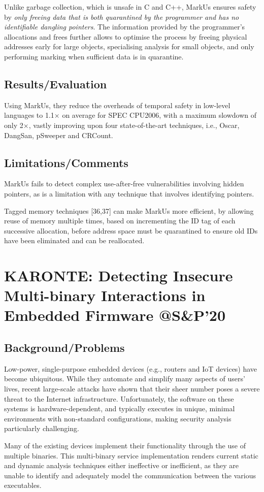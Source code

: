 Unlike garbage collection, which is unsafe in C and C++, MarkUs ensures safety by \emph{only freeing data that is both quarantined by the programmer and has no identifiable dangling pointers}. The information provided by the programmer’s allocations and frees further allows to optimise the process by freeing physical addresses early for large objects, specialising analysis for small objects, and only performing marking when sufficient data is in quarantine. 
\subsection{Results/Evaluation}
Using MarkUs, they reduce the overheads of temporal safety in low-level languages to 1.1$\times$ on average for SPEC CPU2006, with a maximum slowdown of only 2$\times$, vastly improving upon four state-of-the-art techniques, i.e., Oscar, DangSan, pSweeper and CRCount.
\subsection{Limitations/Comments}
MarkUs fails to detect complex use-after-free vulnerabilities involving hidden pointers, as is a limitation with any technique that involves identifying pointers.

Tagged memory techniques [36,37] can make MarkUs more efficient, by allowing reuse of memory multiple times, based on incrementing the ID tag of each successive allocation, before address space must be quarantined to ensure old IDs have been eliminated and can be reallocated.
\newpage
\section{KARONTE: Detecting Insecure Multi-binary Interactions in Embedded Firmware @S\&P'20}
\subsection{Background/Problems}
Low-power, single-purpose embedded devices (e.g., routers and IoT devices) have become ubiquitous. While they automate and simplify many aspects of users’ lives, recent large-scale attacks have shown that their sheer number poses a severe threat to the Internet infrastructure. Unfortunately, the software on these systems is hardware-dependent, and typically executes in unique, minimal environments with non-standard configurations, making security analysis particularly challenging.  

Many of the existing devices implement their functionality through the use of multiple binaries. This multi-binary service implementation renders current static and dynamic analysis techniques either ineffective or inefficient, as they are unable to identify and adequately model the communication between the various executables.
